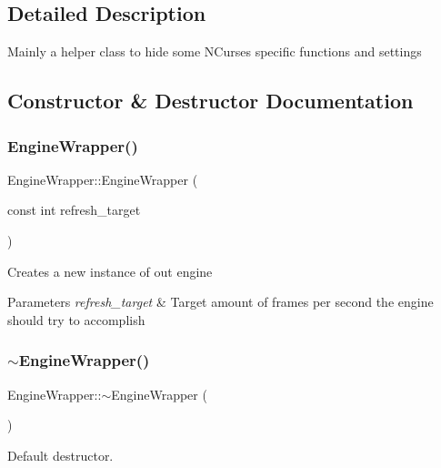 \subsection{Detailed Description}
Mainly a helper class to hide some N\+Curses specific functions and settings 

\subsection{Constructor \& Destructor Documentation}
\mbox{\label{classEngineWrapper_a7d136e07dd38ffca1a37de9c35810033}} 
\subsubsection{\texorpdfstring{Engine\+Wrapper()}{EngineWrapper()}}
{\footnotesize\ttfamily Engine\+Wrapper\+::\+Engine\+Wrapper (\begin{DoxyParamCaption}\item[{const int}]{refresh\+\_\+target }\end{DoxyParamCaption})}

Creates a new instance of out engine


\begin{DoxyParams}{Parameters}
{\em refresh\+\_\+target} & Target amount of frames per second the engine should try to accomplish \\
\hline
\end{DoxyParams}
\mbox{\label{classEngineWrapper_afe15effdb74568bc23c189cd8933034d}} 
\subsubsection{\texorpdfstring{$\sim$\+Engine\+Wrapper()}{~EngineWrapper()}}
{\footnotesize\ttfamily Engine\+Wrapper\+::$\sim$\+Engine\+Wrapper (\begin{DoxyParamCaption}{ }\end{DoxyParamCaption})}



Default destructor. 



